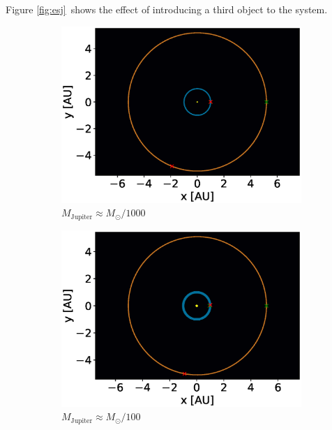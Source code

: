 \documentclass[a4paper,10pt,twocolumn]{article}
\begin{document}
Figure \ref{fig:esj} shows the effect of introducing a third object to the system. 

\begin{figure}
	\centering
	\begin{subfigure}{.5\textwidth}
		\centering
		\includegraphics[width=\linewidth]{esj20vv7.eps}
		\caption{$M_\text{Jupiter} \approx M_\odot/1000$}
	\end{subfigure}%
	\begin{subfigure}{.5\textwidth}
		\centering
		\includegraphics[width=\linewidth]{esjx1020vv7.eps}
		\caption{$M_\text{Jupiter} \approx M_\odot/100$}
	\end{subfigure}%
	\newline%
	\begin{subfigure}{.5\textwidth}

\end{subfigure}
\end{figure}
\end{document}
